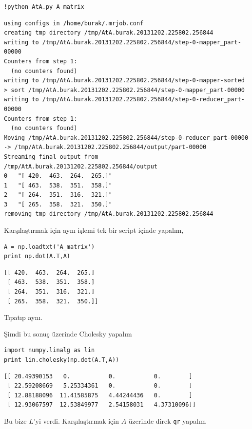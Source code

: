 \documentclass[12pt,fleqn]{article}\usepackage{../../common}
\begin{document}
\begin{verbatim}
!python AtA.py A_matrix
\end{verbatim}

\begin{verbatim}
using configs in /home/burak/.mrjob.conf
creating tmp directory /tmp/AtA.burak.20131202.225802.256844
writing to /tmp/AtA.burak.20131202.225802.256844/step-0-mapper_part-00000
Counters from step 1:
  (no counters found)
writing to /tmp/AtA.burak.20131202.225802.256844/step-0-mapper-sorted
> sort /tmp/AtA.burak.20131202.225802.256844/step-0-mapper_part-00000
writing to /tmp/AtA.burak.20131202.225802.256844/step-0-reducer_part-00000
Counters from step 1:
  (no counters found)
Moving /tmp/AtA.burak.20131202.225802.256844/step-0-reducer_part-00000 -> /tmp/AtA.burak.20131202.225802.256844/output/part-00000
Streaming final output from /tmp/AtA.burak.20131202.225802.256844/output
0	"[ 420.  463.  264.  265.]"
1	"[ 463.  538.  351.  358.]"
2	"[ 264.  351.  316.  321.]"
3	"[ 265.  358.  321.  350.]"
removing tmp directory /tmp/AtA.burak.20131202.225802.256844
\end{verbatim}

Karşılaştırmak için aynı işlemi tek bir script içinde yapalım, 

\begin{verbatim}
A = np.loadtxt('A_matrix')
print np.dot(A.T,A)
\end{verbatim}

\begin{verbatim}
[[ 420.  463.  264.  265.]
 [ 463.  538.  351.  358.]
 [ 264.  351.  316.  321.]
 [ 265.  358.  321.  350.]]
\end{verbatim}

Tıpatıp aynı. 

Şimdi bu sonuç üzerinde Cholesky yapalım

\begin{verbatim}
import numpy.linalg as lin
print lin.cholesky(np.dot(A.T,A))
\end{verbatim}

\begin{verbatim}
[[ 20.49390153   0.           0.           0.        ]
 [ 22.59208669   5.25334361   0.           0.        ]
 [ 12.88188096  11.41585875   4.44244436   0.        ]
 [ 12.93067597  12.53849977   2.54158031   4.37310096]]
\end{verbatim}

Bu bize $L$'yi verdi. Karşılaştırmak için $A$ üzerinde direk \verb!qr!
yapalım
\end{document}
